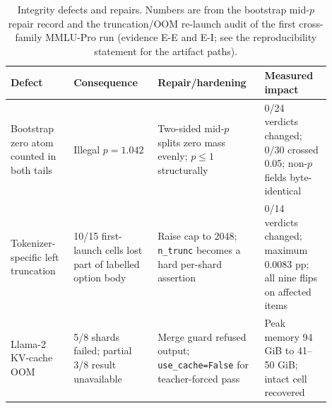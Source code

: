 \begin{table}[t]
\centering
\small
\setlength{\tabcolsep}{4.2pt}
\begin{tabular}{p{0.18\linewidth}p{0.24\linewidth}p{0.29\linewidth}p{0.19\linewidth}}
\toprule
Defect & Consequence & Repair/hardening & Measured impact \\
\midrule
Bootstrap zero atom counted in both tails & Illegal $p=1.042$ & Two-sided mid-$p$ splits zero mass evenly; $p\leq1$ structurally & 0/24 verdicts changed; 0/30 crossed 0.05; non-$p$ fields byte-identical \\
Tokenizer-specific left truncation & 10/15 first-launch cells lost part of labelled option body & Raise cap to 2048; \texttt{n\_trunc} becomes a hard per-shard assertion & 0/14 verdicts changed; maximum 0.0083 pp; all nine flips on affected items \\
Llama-2 KV-cache OOM & 5/8 shards failed; partial 3/8 result unavailable & Merge guard refused output; \texttt{use\_cache=False} for teacher-forced pass & Peak memory 94 GiB to 41--50 GiB; intact cell recovered \\
\bottomrule
\end{tabular}
\caption{Integrity defects and repairs. Numbers are from the bootstrap mid-$p$ repair record and the truncation/OOM re-launch audit of the first cross-family MMLU-Pro run (evidence \textsf{E-E} and \textsf{E-I}; see the reproducibility statement for the artifact paths).}
\label{tab:integrity}
\end{table}
